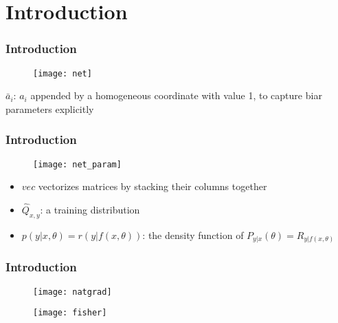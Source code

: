 \section{Introduction}

\begin{frame}
\frametitle{Introduction}

\begin{figure}
    \centering
    \texttt{[image: net]}
\end{figure}

$\bar{a}_i$: $a_i$ appended by a homogeneous coordinate with value 1,
to capture biar parameters explicitly
\end{frame}

\begin{frame}
\frametitle{Introduction}

\begin{figure}
    \centering
    \texttt{[image: net\_param]}
\end{figure}

\begin{itemize}
    \item $vec$ vectorizes matrices by stacking their columns together
    \item $\hat{Q}_{x, y}$: a training distribution
    \item $p(y|x, \theta) = r(y|f(x, \theta))$: the density function of $P_{y|x}(\theta) = R_{y|f(x,\theta)}$
\end{itemize}

\end{frame}

\begin{frame}
\frametitle{Introduction}
\begin{figure}
    \centering
    \texttt{[image: natgrad]}
\end{figure}

\begin{figure}
    \centering
    \texttt{[image: fisher]}
\end{figure}

\end{frame}
